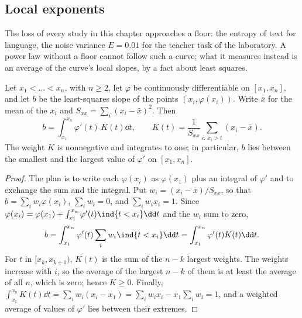 \begin{refsection}
\subsection*{Local exponents}

The loss of every study in this chapter approaches a floor: the entropy of text for language, the noise variance $E=0.01$ for the teacher task of the laboratory. A power law without a floor cannot follow such a curve; what it measures instead is an average of the curve's local slopes, by a fact about least squares.

\begin{lemma}\label{lem:protocol:ols}
Let $x_1<\dots<x_n$, with $n\ge2$, let $\varphi$ be continuously differentiable on $[x_1,x_n]$, and let $b$ be the least-squares slope of the points $(x_i,\varphi(x_i))$. Write $\bar x$ for the mean of the $x_i$ and $S_{xx}=\sum_i(x_i-\bar x)^2$. Then
\[
b=\int_{x_1}^{x_n}\varphi'(t)\,K(t)\dd t,\qquad K(t)=\frac1{S_{xx}}\sum_{i:\,x_i>t}(x_i-\bar x).
\]
The weight $K$ is nonnegative and integrates to one; in particular, $b$ lies between the smallest and the largest value of $\varphi'$ on $[x_1,x_n]$.
\end{lemma}

\begin{proof}
The plan is to write each $\varphi(x_i)$ as $\varphi(x_1)$ plus an integral of $\varphi'$ and to exchange the sum and the integral. Put $w_i=(x_i-\bar x)/S_{xx}$, so that $b=\sum_iw_i\varphi(x_i)$, $\sum_iw_i=0$, and $\sum_iw_ix_i=1$. Since $\varphi(x_i)=\varphi(x_1)+\int_{x_1}^{x_n}\varphi'(t)\ind\{t<x_i\}\dd t$ and the $w_i$ sum to zero,
\[
b=\int_{x_1}^{x_n}\varphi'(t)\sum_iw_i\ind\{t<x_i\}\dd t=\int_{x_1}^{x_n}\varphi'(t)K(t)\dd t .
\]
For $t$ in $[x_k,x_{k+1})$, $K(t)$ is the sum of the $n-k$ largest weights. The weights increase with $i$, so the average of the largest $n-k$ of them is at least the average of all $n$, which is zero; hence $K\ge0$. Finally, $\int_{x_1}^{x_n}K(t)\dd t=\sum_iw_i(x_i-x_1)=\sum_iw_ix_i-x_1\sum_iw_i=1$, and a weighted average of values of $\varphi'$ lies between their extremes.
\end{proof}


\end{refsection}
